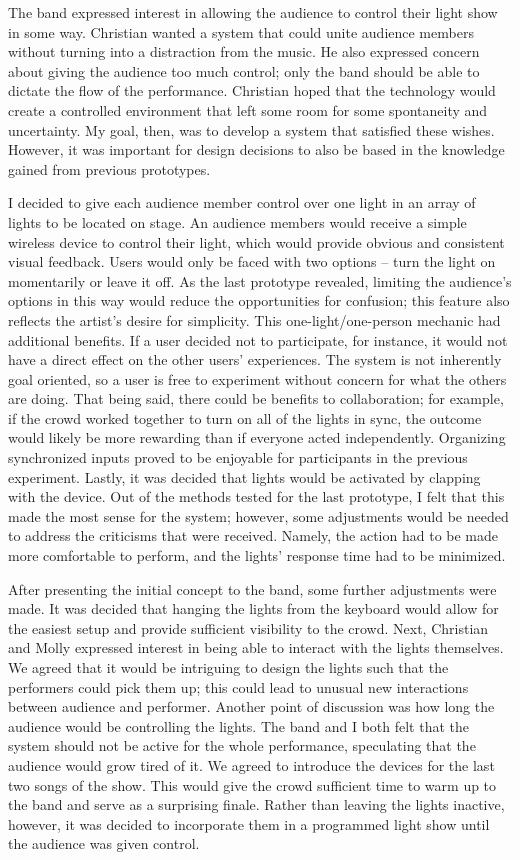 The band expressed interest in allowing the audience to control their light show in some way. Christian wanted a system that could unite audience members without turning into a distraction from the music. He also expressed concern about giving the audience too much control; only the band should be able to dictate the flow of the performance. Christian hoped that the technology would create a controlled environment that left some room for some spontaneity and uncertainty. My goal, then, was to develop a system that satisfied these wishes. However, it was important for design decisions to also be based in the knowledge gained from previous prototypes.

I decided to give each audience member control over one light in an array of lights to be located on stage. An audience members would receive a simple wireless device to control their light, which would provide obvious and consistent visual feedback. Users would only be faced with two options -- turn the light on momentarily or leave it off. As the last prototype revealed, limiting the audience's options in this way would reduce the opportunities for confusion; this feature also reflects the artist's desire for simplicity. This one-light/one-person mechanic had additional benefits. If a user decided not to participate, for instance, it would not have a direct effect on the other users' experiences. The system is not inherently goal oriented, so a user is free to experiment without concern for what the others are doing. That being said, there could be benefits to collaboration; for example, if the crowd worked together to turn on all of the lights in sync, the outcome would likely be more rewarding than if everyone acted independently. Organizing synchronized inputs proved to be enjoyable for participants in the previous experiment. Lastly, it was decided that lights would be activated by clapping with the device. Out of the methods tested for the last prototype, I felt that this made the most sense for the system; however, some adjustments would be needed to address the criticisms that were received. Namely, the action had to be made more comfortable to perform, and the lights' response time had to be minimized.

After presenting the initial concept to the band, some further adjustments were made. It was decided that hanging the lights from the keyboard would allow for the easiest setup and provide sufficient visibility to the crowd. Next, Christian and Molly expressed interest in being able to interact with the lights themselves. We agreed that it would be intriguing to design the lights such that the performers could pick them up; this could lead to unusual new interactions between audience and performer. Another point of discussion was how long the audience would be controlling the lights. The band and I both felt that the system should not be active for the whole performance, speculating that the audience would grow tired of it. We agreed to introduce the devices for the last two songs of the show. This would give the crowd sufficient time to warm up to the band and serve as a surprising finale. Rather than leaving the lights inactive, however, it was decided to incorporate them in a programmed light show until the audience was given control.

